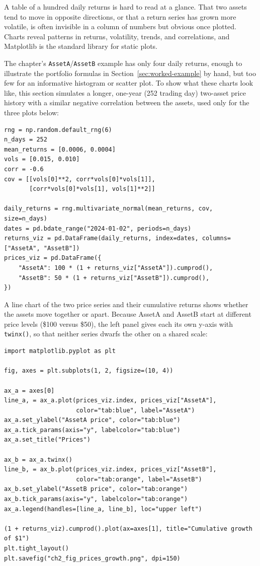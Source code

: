 \documentclass[../ai_in_finance]{subfiles}
\begin{document}
A table of a hundred daily returns is hard to read at a glance. That two assets tend to move in opposite directions, or that a return series has grown more volatile, is often invisible in a column of numbers but obvious once plotted. Charts reveal patterns in returns, volatility, trends, and correlations, and Matplotlib is the standard library for static plots.

The chapter's \texttt{AssetA}/\texttt{AssetB} example has only four daily returns, enough to illustrate the portfolio formulas in Section~\ref{sec:worked-example} by hand, but too few for an informative histogram or scatter plot. To show what these charts look like, this section simulates a longer, one-year (252 trading day) two-asset price history with a similar negative correlation between the assets, used only for the three plots below:

\begin{verbatim}
rng = np.random.default_rng(6)
n_days = 252
mean_returns = [0.0006, 0.0004]
vols = [0.015, 0.010]
corr = -0.6
cov = [[vols[0]**2, corr*vols[0]*vols[1]],
       [corr*vols[0]*vols[1], vols[1]**2]]

daily_returns = rng.multivariate_normal(mean_returns, cov, size=n_days)
dates = pd.bdate_range("2024-01-02", periods=n_days)
returns_viz = pd.DataFrame(daily_returns, index=dates, columns=["AssetA", "AssetB"])
prices_viz = pd.DataFrame({
    "AssetA": 100 * (1 + returns_viz["AssetA"]).cumprod(),
    "AssetB": 50 * (1 + returns_viz["AssetB"]).cumprod(),
})
\end{verbatim}

A line chart of the two price series and their cumulative returns shows whether the assets move together or apart. Because AssetA and AssetB start at different price levels (\$100 versus \$50), the left panel gives each its own y-axis with \texttt{twinx()}, so that neither series dwarfs the other on a shared scale:

\begin{verbatim}
import matplotlib.pyplot as plt

fig, axes = plt.subplots(1, 2, figsize=(10, 4))

ax_a = axes[0]
line_a, = ax_a.plot(prices_viz.index, prices_viz["AssetA"],
                    color="tab:blue", label="AssetA")
ax_a.set_ylabel("AssetA price", color="tab:blue")
ax_a.tick_params(axis="y", labelcolor="tab:blue")
ax_a.set_title("Prices")

ax_b = ax_a.twinx()
line_b, = ax_b.plot(prices_viz.index, prices_viz["AssetB"],
                    color="tab:orange", label="AssetB")
ax_b.set_ylabel("AssetB price", color="tab:orange")
ax_b.tick_params(axis="y", labelcolor="tab:orange")
ax_a.legend(handles=[line_a, line_b], loc="upper left")

(1 + returns_viz).cumprod().plot(ax=axes[1], title="Cumulative growth of $1")
plt.tight_layout()
plt.savefig("ch2_fig_prices_growth.png", dpi=150)
\end{verbatim}
\end{document}

